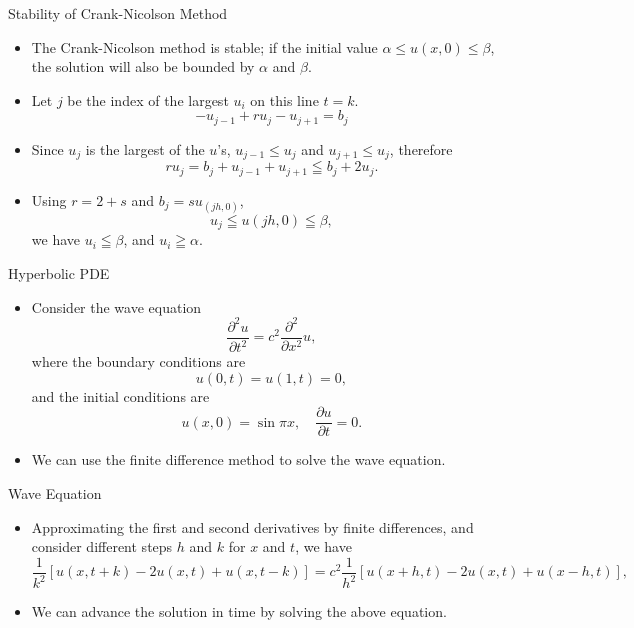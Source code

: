 \documentclass{beamer}
\newcommand{\beforeverb}{\footnotesize}
\newcommand{\afterverb}{\normalsize}
\begin{document}
\begin{frame}{Stability of Crank-Nicolson Method}
    \begin{itemize}
        \item The Crank-Nicolson method is  stable; if the initial value $\alpha \leq u(x,0) \leq \beta$, the solution will also be bounded by $\alpha$ and $\beta$.
        \item Let $j$ be the index of the largest $u_i$ on this line $t = k$. 
        \[
            -u_{j-1}+r u_j-u_{j+1}=b_j
        \]
        \item Since $u_j$ is the largest of the $u$'s, $u_{j-1} \le  u_j$ and $u_{j+1}\le u_j$, therefore 
        \[
            r u_j=b_j+u_{j-1}+u_{j+1} \leqq b_j+2 u_j.
        \]
        \item Using $r=2+s$ and $b_j=su_(jh,0)$,
        \[
        u_j \leqq u(j h, 0) \leqq \beta,
        \]
        we have $u_i \leqq \beta$, and $u_i \geqq \alpha$. 
         
    \end{itemize}

\end{frame}
\begin{frame}{Hyperbolic PDE}
    \begin{itemize}
        \item Consider the wave equation
        \[
        \frac{\partial^2 u}{\partial t^2} = c^2 \frac{\partial ^2}{\partial x^2} u,
        \]
        where the boundary conditions are 
        \[
        u(0, t) = u(1, t) = 0,
        \]
        and the initial conditions are 
        \[
        u(x, 0) = \sin \pi x, \quad \frac{\partial u}{\partial t} = 0.
        \]
        \item We can use the finite difference method to solve the wave equation.
    \end{itemize}

\end{frame}
\begin{frame}{Wave Equation}
    \begin{itemize}
        \item Approximating the first and second derivatives by finite differences, and consider different steps 
        $h$ and $k$ for $x$ and $t$, we have
        \beforeverb
        \[
        \frac{1}{k^2}[u(x, t+k)-2 u(x, t)+u(x, t-k)]=
        c^2 \frac{1}{h^2}[u(x+h, t)-2 u(x, t)+u(x-h, t)],
        \]
        \afterverb
       
        \item We can advance the solution in time by solving the above equation.
    \end{itemize}
\end{frame}
\end{document}
